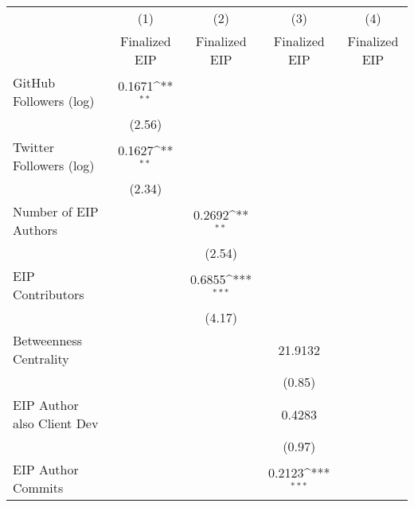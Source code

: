 {
\def\sym#1{\ifmmode^{#1}\else\(^{#1}\)\fi}
\begin{tabular}{l*{4}{c}}
\hline\hline
                                   &\multicolumn{1}{c}{(1)}         &\multicolumn{1}{c}{(2)}         &\multicolumn{1}{c}{(3)}         &\multicolumn{1}{c}{(4)}         \\
                                   &Finalized EIP         &Finalized EIP         &Finalized EIP         &Finalized EIP         \\
\hline
GitHub Followers (log)             &    0.1671\sym{**} &                   &                   &                   \\
                                   &    (2.56)         &                   &                   &                   \\
[1em]
Twitter Followers (log)            &    0.1627\sym{**} &                   &                   &                   \\
                                   &    (2.34)         &                   &                   &                   \\
[1em]
Number of EIP Authors              &                   &    0.2692\sym{**} &                   &                   \\
                                   &                   &    (2.54)         &                   &                   \\
[1em]
EIP Contributors                   &                   &    0.6855\sym{***}&                   &                   \\
                                   &                   &    (4.17)         &                   &                   \\
[1em]
Betweenness Centrality             &                   &                   &   21.9132         &                   \\
                                   &                   &                   &    (0.85)         &                   \\
[1em]
EIP Author also Client Dev         &                   &                   &    0.4283         &                   \\
                                   &                   &                   &    (0.97)         &                   \\
[1em]
EIP Author Commits                 &                   &                   &    0.2123\sym{***}&                   \\

\end{tabular}}
